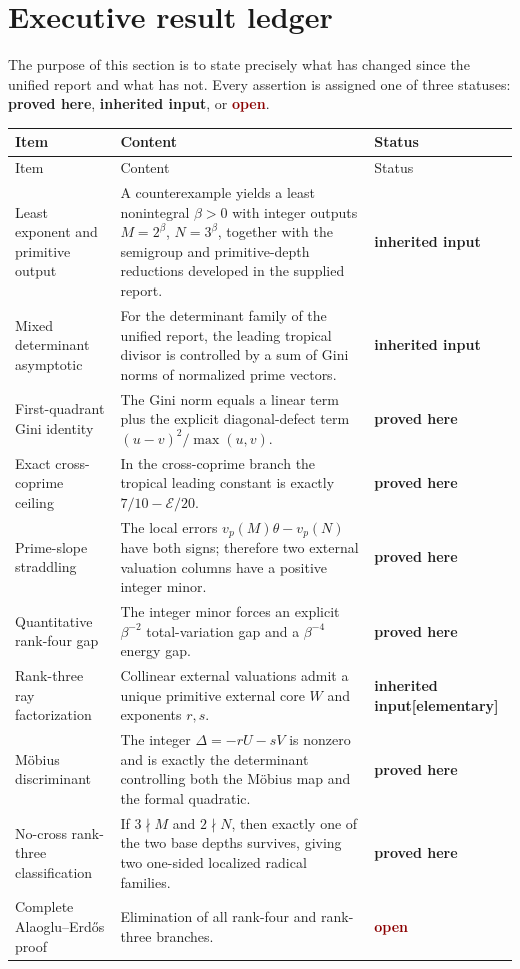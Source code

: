 \documentclass[11pt,oneside]{article}
\theoremstyle{research}
\theoremstyle{definition}
\newcommand{\E}{\mathcal E}
\newcommand{\statusproved}{\textcolor{deepgreen}{\textbf{proved here}}}
\newcommand{\statusinherited}{\textcolor{deepblue}{\textbf{inherited input}}}
\newcommand{\statusopen}{\textcolor{darkred}{\textbf{open}}}
\begin{document}
\section{Executive result ledger}

The purpose of this section is to state precisely what has changed since the
unified report and what has not.  Every assertion is assigned one of three
statuses: \statusproved, \statusinherited, or \statusopen.

\begin{longtable}{p{}p{}p{}}
\toprule
Item & Content & Status\\
\midrule
\endfirsthead
\toprule
Item & Content & Status\\
\midrule
\endhead
Least exponent and primitive output & A counterexample yields a least
nonintegral $\beta>0$ with integer outputs $M=2^\beta$, $N=3^\beta$, together
with the semigroup and primitive-depth reductions developed in the supplied
report. & \statusinherited\\
\addlinespace
Mixed determinant asymptotic & For the determinant family of the unified
report, the leading tropical divisor is controlled by a sum of Gini norms of
normalized prime vectors. & \statusinherited\\
\addlinespace
First-quadrant Gini identity & The Gini norm equals a linear term plus the
explicit diagonal-defect term $(u-v)^2/\max(u,v)$. & \statusproved\\
\addlinespace
Exact cross-coprime ceiling & In the cross-coprime branch the tropical leading
constant is exactly $7/10-\E/20$. & \statusproved\\
\addlinespace
Prime-slope straddling & The local errors $v_p(M)\theta-v_p(N)$ have both
signs; therefore two external valuation columns have a positive integer
minor. & \statusproved\\
\addlinespace
Quantitative rank-four gap & The integer minor forces an explicit
$\beta^{-2}$ total-variation gap and a $\beta^{-4}$ energy gap. & \statusproved\\
\addlinespace
Rank-three ray factorization & Collinear external valuations admit a unique
primitive external core $W$ and exponents $r,s$. & \statusinherited\newline\textbf{[elementary]}\\
\addlinespace
M\"obius discriminant & The integer $\Delta=-rU-sV$ is nonzero and is exactly
the determinant controlling both the M\"obius map and the formal quadratic. & \statusproved\\
\addlinespace
No-cross rank-three classification & If $3\nmid M$ and $2\nmid N$, then exactly
one of the two base depths survives, giving two one-sided localized radical
families. & \statusproved\\
\addlinespace
Complete Alaoglu--Erdős proof & Elimination of all rank-four and rank-three
branches. & \statusopen\\
\bottomrule
\end{longtable}
\end{document}
